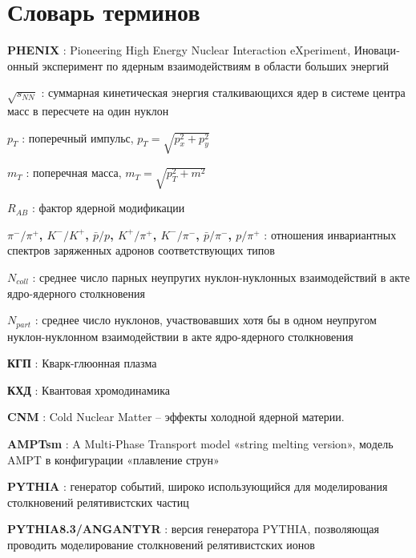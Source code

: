 \chapter*{Словарь терминов}             %

\textbf{PHENIX} : Pioneering High Energy Nuclear Interaction eXperiment, Иноваци­онный эксперимент по ядерным взаимодействиям в области больших энергий

\textbf{$\sqrt{s_{NN}}$} : суммарная кинетическая энергия сталкивающихся ядер в системе центра масс в пересчете на один нуклон

\textbf{$p_T$} : поперечный импульс, $p_T = \sqrt{p_x^2 +p_y^2}$

\textbf{$m_T$} : поперечная масса, $m_T = \sqrt{p_T^2 +m^2}$

\textbf{$R_{AB}$} : фактор ядерной модификации

\textbf{$\pi^-/\pi^+$, $K^-/K^+$, $\bar{p}/p$, $K^+/\pi^+$, $K^-/\pi^-$, $\bar{p}/\pi^-$, $p/\pi^+$} : отношения инвариантных спектров заряженных адронов соответствующих типов

\textbf{$N_{coll}$} : среднее число парных неупругих нуклон-нуклонных взаимодействий в акте ядро-ядерного столкновения

\textbf{$N_{part}$} : среднее число нуклонов, участвовавших хотя бы в одном неупругом нуклон-нуклонном взаимодействии в акте ядро-ядерного столкновения

\textbf{КГП} : Кварк-глюонная плазма

\textbf{КХД} : Квантовая хромодинамика

\textbf{CNM} : Cold Nuclear Matter -- эффекты холодной ядерной материи.

\textbf{AMPTsm} : A Multi-Phase Transport model «string melting version», мо­дель AMPT в конфигурации «плавление струн»

\textbf{PYTHIA} : генератор событий, широко использующийся для моделирования столкновений релятивистских частиц

\textbf{PYTHIA8.3/ANGANTYR} : версия генератора PYTHIA, позволяющая проводить моделирование столкновений релятивистских ионов

